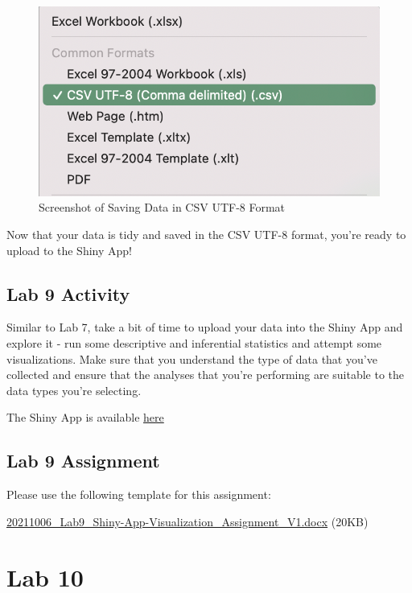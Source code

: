\documentclass[
]{book}
\begin{document}
\begin{figure}
\centering
\includegraphics{figures_images/csv-UTF8.png}
\caption{Screenshot of Saving Data in CSV UTF-8 Format}
\end{figure}

Now that your data is tidy and saved in the CSV UTF-8 format, you're ready to upload to the Shiny App!

\hypertarget{lab-9-activity}{%
\chapter*{Lab 9 Activity}\label{lab-9-activity}}

Similar to Lab 7, take a bit of time to upload your data into the Shiny App and explore it - run some descriptive and inferential statistics and attempt some visualizations. Make sure that you understand the type of data that you've collected and ensure that the analyses that you're performing are suitable to the data types you're selecting.

The Shiny App is available \href{https://openscience.ok.ubc.ca/shiny/BIOL-116/}{here}

\hypertarget{lab-9-assignment}{%
\chapter*{Lab 9 Assignment}\label{lab-9-assignment}}

Please use the following template for this assignment:

\href{files/20211006_Lab9_Shiny-App-Visualization_Assignment_V1.docx}{20211006\_Lab9\_Shiny-App-Visualization\_Assignment\_V1.docx} (20KB)

\hypertarget{part-lab-10}{%
\part*{Lab 10}\label{part-lab-10}}
\end{document}
